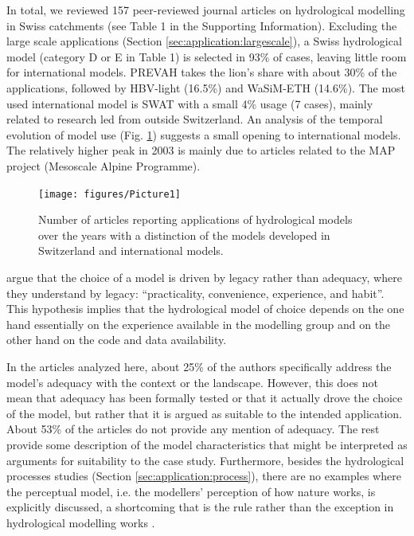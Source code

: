 \documentclass[10pt,a4paper]{article}
\begin{document}
In total, we reviewed 157 peer-reviewed journal articles on hydrological
modelling in Swiss catchments (see Table 1 in the Supporting
Information). Excluding the large scale applications (Section \ref{sec:application:largescale}), a
Swiss hydrological model (category D or E in Table 1) is selected in
93\% of cases, leaving little room for international models. PREVAH
takes the lion's share with about 30\% of the applications, followed by
HBV-light (16.5\%) and WaSiM-ETH (14.6\%). The most used international
model is SWAT with a small 4\% usage (7 cases), mainly related to
research led from outside Switzerland. An analysis of the temporal
evolution of model use (Fig. \ref{fig:bars})
suggests a small opening to international models. The relatively higher
peak in 2003 is mainly due to articles related to the MAP project
(Mesoscale Alpine Programme).

\begin{figure}[htb]
	\begin{center}
		\texttt{[image: figures/Picture1]}
		\caption{{{Number of articles} reporting applications of hydrological models over
				the years with a distinction of the models developed in Switzerland and
				international models.
				{\label{fig:bars}}
		}}
	\end{center}
\end{figure}

\citet{Addor_2019} argue that the choice of a model is driven by legacy
rather than adequacy, where they understand by legacy: ``practicality,
convenience, experience, and habit''. This hypothesis implies that the
hydrological model of choice depends on the one hand essentially on the
experience available in the modelling group and on the other hand on
the code and data availability. 

In the articles analyzed here, about 25\% of the authors specifically
address the model's adequacy with the context or the landscape. However,
this does not mean that adequacy has been formally tested or that it
actually drove the choice of the model, but rather that it is argued as
suitable to the intended application. About 53\% of the articles do not
provide any mention of adequacy. The rest provide some description of
the model characteristics that might be interpreted as arguments for
suitability to the case study. Furthermore, besides the hydrological
processes studies (Section \ref{sec:application:process}), there are no examples where the
perceptual model, i.e. the modellers' perception of how nature works, is
explicitly discussed, a shortcoming that is the rule rather than the
exception in hydrological modelling works \citep{beven2021}.
\end{document}
